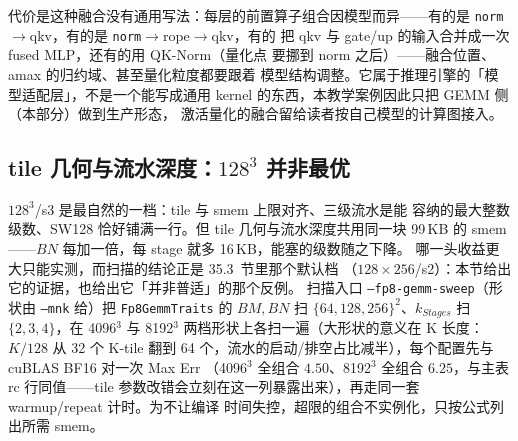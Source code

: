 代价是这种融合没有通用写法：每层的前置算子组合因模型而异——有的是
\texttt{norm}$\to$qkv，有的是 \texttt{norm}$\to$rope$\to$qkv，有的
把 qkv 与 gate/up 的输入合并成一次 fused MLP，还有的用 QK-Norm（量化点
要挪到 norm 之后）——融合位置、amax 的归约域、甚至量化粒度都要跟着
模型结构调整。它属于推理引擎的「模型适配层」，不是一个能写成通用
kernel 的东西，本教学案例因此只把 GEMM 侧（本部分）做到生产形态，
激活量化的融合留给读者按自己模型的计算图接入。

\subsection{tile 几何与流水深度：$128^3$ 并非最优}\label{sec:35-sweep}

$128^3$/s3 是最自然的一档：tile 与 smem 上限对齐、三级流水是能
容纳的最大整数级数、SW128 恰好铺满一行。但 tile 几何与流水深度共用同一块
99\,KB 的 smem——$BN$ 每加一倍，每 stage 就多 16\,KB，能塞的级数随之下降。
哪一头收益更大只能实测，而扫描的结论正是 35.3~节里那个默认档
（$128\times256$/s2）：本节给出它的证据，也给出它「并非普适」的那个反例。
扫描入口 \texttt{--fp8-gemm-sweep}（形状由
\texttt{--mnk} 给）把 \texttt{Fp8GemmTraits} 的 $BM,BN$ 扫
$\{64,128,256\}^2$、$k_{Stages}$ 扫 $\{2,3,4\}$，在 4096$^3$ 与 8192$^3$
两档形状上各扫一遍（大形状的意义在 K 长度：$K/128$ 从 32 个 K-tile 翻到
64 个，流水的启动/排空占比减半），每个配置先与 cuBLAS BF16 对一次 Max Err
（4096$^3$ 全组合 $4.50$、8192$^3$ 全组合 $6.25$，与主表 rc 行同值——tile
参数改错会立刻在这一列暴露出来），再走同一套 warmup/repeat 计时。为不让编译
时间失控，超限的组合不实例化，只按公式列出所需 smem。

